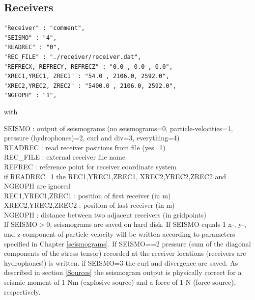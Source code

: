 \documentclass{hitec}
\begin{document}
\subsection{Receivers}
\label{Receivers}
\begin{verbatim}
"Receiver" : "comment",
"SEISMO" : "4",
"READREC" : "0",
"REC_FILE" : "./receiver/receiver.dat",
"REFRECX, REFRECY, REFRECZ" : "0.0 , 0.0 , 0.0",
"XREC1,YREC1, ZREC1" : "54.0 , 2106.0, 2592.0",
"XREC2,YREC2, ZREC2" : "5400.0 , 2106.0, 2592.0",
"NGEOPH" : "1",
\end{verbatim}

with 

SEISMO : output of seismograms (no seismograms=0, particle-velocities=1, pressure (hydrophones)=2, curl and div=3, everything=4)\\
READREC : read receiver positions from file (yes=1)\\
REC\_FILE : external receiver file name\\
REFREC : reference point for receiver coordinate system\\
if READREC=1 the REC1,YREC1,ZREC1, XREC2,YREC2,ZREC2 and NGEOPH are ignored\\ 
REC1,YREC1,ZREC1 : position of first receiver (in m)\\
XREC2,YREC2,ZREC2 : position of last receiver (in m)\\
NGEOPH : distance between two adjacent receivers (in gridpoints)\\


If SEISMO$>$0, seismograms are saved on hard disk. If SEISMO equals 1 x-, y-, and z-component of particle velocity will be written according to parameters specified in Chapter \ref{seismograms}.
If SEISMO==2 pressure (sum of the diagonal components of the stress tensor) recorded at the receiver locations (receivers are hydrophones!) is written. if SEISMO=3 the curl and divergence are saved. As described in section \ref{Sources} the seismogram output is physically correct for a seismic moment of 1 Nm (explosive source) and a force of 1 N (force source), respectively.
\end{document}
